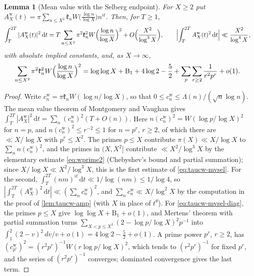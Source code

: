 \documentclass[11pt,a4paper]{article}
\numberwithin{equation}{section}
\newtheorem{lemma}[theorem]{Lemma}
\theoremstyle{definition}
\theoremstyle{remark}
\newcommand{\dd}{\,\mathrm dt}
\begin{document}
\begin{lemma}[Mean value with the Selberg endpoint]\label{lem:taucw-mvsel}
For $X\ge2$ put $A^{\mathrm w}_X(t)=\pi\sum_{n\le X^2}\mathfrak k_nW\bigl(\frac{\log n}{\log X}\bigr)n^{it}$. Then, for $T\ge1$,
\begin{equation}\label{eq:taucw-mvsel}
\int_T^{2T}|A^{\mathrm w}_X(t)|^2\dd=T\sum_{n\le X^2}\pi^2\mathfrak k_n^2W\Bigl(\frac{\log n}{\log X}\Bigr)^2+O\Bigl(\frac{X^2}{\log^3X}\Bigr),\qquad
\Bigl|\int_T^{2T}A^{\mathrm w}_X(t)^2\dd\Bigr|\ll\frac{X^2}{\log^4X},
\end{equation}
with absolute implied constants, and, as $X\to\infty$,
\begin{equation}\label{eq:taucw-mvsel-diag}
\sum_{n\le X^2}\pi^2\mathfrak k_n^2W\Bigl(\frac{\log n}{\log X}\Bigr)^2=\log\log X+\mathrm B_1+4\log2-\frac52+\sum_p\sum_{r\ge2}\frac1{r^2p^r}+o(1).
\end{equation}
\end{lemma}
\begin{proof}
Write $c^{\mathrm w}_n=\pi\mathfrak k_nW(\log n/\log X)$, so that $0\le c^{\mathrm w}_n\le\Lambda(n)/(\sqrt n\log n)$. The mean value theorem of Montgomery and Vaughan \cite{MontgomeryVaughan} gives $\int_T^{2T}|A^{\mathrm w}_X|^2\dd=\sum_n(c^{\mathrm w}_n)^2(T+O(n))$. Here $n(c^{\mathrm w}_n)^2=W(\log p/\log X)^2$ for $n=p$, and $n(c^{\mathrm w}_n)^2\le r^{-2}\le1$ for $n=p^r$, $r\ge2$, of which there are $\ll X/\log X$ with $p^r\le X^2$. The primes $p\le X$ contribute $\pi(X)\ll X/\log X$ to $\sum_nn(c^{\mathrm w}_n)^2$, and the primes in $(X,X^2]$ contribute $\ll X^2/\log^3X$ by the elementary estimate \eqref{eq:wprime2} (Chebyshev's bound and partial summation); since $X/\log X\ll X^2/\log^3X$, this is the first estimate of \eqref{eq:taucw-mvsel}. For the second, $\int_T^{2T}(nm)^{it}\dd\ll1/\log(nm)\le1/\log4$, so $|\int_T^{2T}(A^{\mathrm w}_X)^2\dd|\ll(\sum_nc^{\mathrm w}_n)^2$, and $\sum_nc^{\mathrm w}_n\ll X/\log^2X$ by the computation in the proof of \cref{lem:taucw-amp} (with $X$ in place of $t^\theta$). For \eqref{eq:taucw-mvsel-diag}, the primes $p\le X$ give $\log\log X+\mathrm B_1+o(1)$, and Mertens' theorem with partial summation turns $\sum_{X<p\le X^2}(2-\log p/\log X)^2p^{-1}$ into $\int_1^2(2-v)^2\,dv/v+o(1)=4\log2-\frac52+o(1)$. A prime power $p^r$, $r\ge2$, has $(c^{\mathrm w}_{p^r})^2=(r^2p^r)^{-1}W(r\log p/\log X)^2$, which tends to $(r^2p^r)^{-1}$ for fixed $p^r$, and the series of $(r^2p^r)^{-1}$ converges; dominated convergence gives the last term.
\end{proof}
\end{document}
